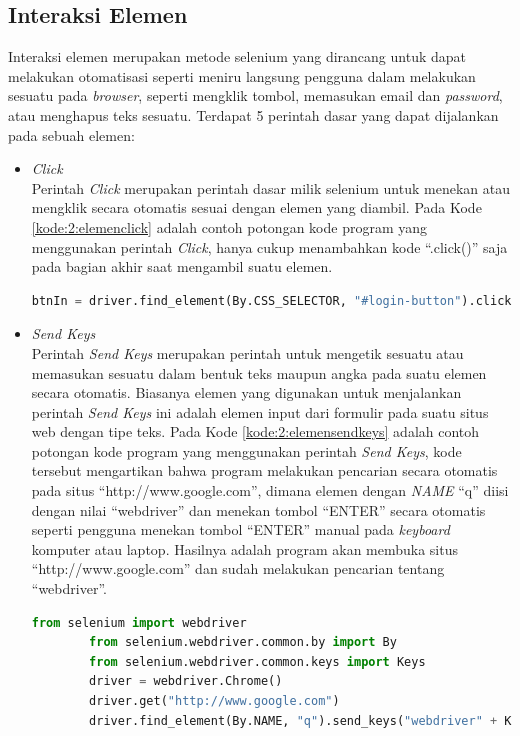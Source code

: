 \subsection{Interaksi Elemen}
Interaksi elemen merupakan metode selenium yang dirancang untuk dapat melakukan otomatisasi seperti meniru langsung pengguna dalam melakukan sesuatu pada \textit{browser}, seperti mengklik tombol, memasukan email dan \textit{password}, atau menghapus teks sesuatu. Terdapat 5 perintah dasar yang dapat dijalankan pada sebuah elemen:
\begin{itemize}
	\item \textit{Click}\\
	Perintah \textit{Click} merupakan perintah dasar milik selenium untuk menekan atau mengklik secara otomatis sesuai dengan elemen yang diambil. Pada Kode \ref{kode:2:elemenclick} adalah contoh potongan kode program yang menggunakan perintah \textit{Click}, hanya cukup menambahkan kode ``.click()'' saja pada bagian akhir saat mengambil suatu elemen.
	\begin{lstlisting}[language=python, caption=Contoh Potongan Kode Perintah \textit{Click} pada Suatu Elemen, label=kode:2:elemenclick]
		btnIn = driver.find_element(By.CSS_SELECTOR, "#login-button").click()
	\end{lstlisting}
	
	\item \textit{Send Keys}\\
	Perintah \textit{Send Keys} merupakan perintah untuk mengetik sesuatu atau memasukan sesuatu dalam bentuk teks maupun angka pada suatu elemen secara otomatis. Biasanya elemen yang digunakan untuk menjalankan perintah \textit{Send Keys} ini adalah elemen input dari formulir pada suatu situs web dengan tipe teks. Pada Kode \ref{kode:2:elemensendkeys} adalah contoh potongan kode program yang menggunakan perintah \textit{Send Keys}, kode tersebut mengartikan bahwa program melakukan pencarian secara otomatis pada situs ``http://www.google.com'', dimana elemen dengan \textit{NAME} ``q'' diisi dengan nilai ``webdriver'' dan menekan tombol ``ENTER'' secara otomatis seperti pengguna menekan tombol ``ENTER'' manual pada \textit{keyboard} komputer atau laptop. Hasilnya adalah program akan membuka situs ``http://www.google.com'' dan sudah melakukan pencarian tentang ``webdriver''.
	\begin{lstlisting}[language=python, caption=Contoh Potongan Kode Perintah \textit{Send Keys} pada Suatu Elemen, label=kode:2:elemensendkeys]
		from selenium import webdriver
		from selenium.webdriver.common.by import By
		from selenium.webdriver.common.keys import Keys
		driver = webdriver.Chrome()
		driver.get("http://www.google.com")
		driver.find_element(By.NAME, "q").send_keys("webdriver" + Keys.ENTER)
	\end{lstlisting}
	

\end{itemize}
